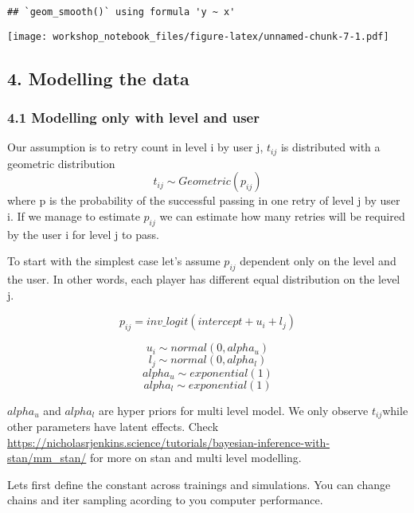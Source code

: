 \documentclass[
]{article}
\newenvironment{Shaded}{\begin{snugshade}}{\end{snugshade}}
\newcommand{\DecValTok}[1]{\textcolor[rgb]{0.00,0.00,0.81}{#1}}
\newcommand{\FunctionTok}[1]{\textcolor[rgb]{0.00,0.00,0.00}{#1}}
\newcommand{\NormalTok}[1]{#1}
\newcommand{\OtherTok}[1]{\textcolor[rgb]{0.56,0.35,0.01}{#1}}
\newcommand{\SpecialCharTok}[1]{\textcolor[rgb]{0.00,0.00,0.00}{#1}}
\begin{document}
\begin{verbatim}
## `geom_smooth()` using formula 'y ~ x'
\end{verbatim}

\texttt{[image: workshop\_notebook\_files/figure-latex/unnamed-chunk-7-1.pdf]}

\hypertarget{modelling-the-data}{%
\subsection{4. Modelling the data}\label{modelling-the-data}}

\hypertarget{modelling-only-with-level-and-user}{%
\subsubsection{4.1 Modelling only with level and
user}\label{modelling-only-with-level-and-user}}

Our assumption is to retry count in level i by user j, \(t_{ij}\) is
distributed with a geometric distribution
\[  t_{ij} \sim Geometric (p_{ij}) \] where p is the probability of the
successful passing in one retry of level j by user i. If we manage to
estimate \(p_{ij}\) we can estimate how many retries will be required by
the user i for level j to pass.

To start with the simplest case let's assume \(p_{ij}\) dependent only
on the level and the user. In other words, each player has different
equal distribution on the level j.

\[  p_{ij} = inv\_logit(intercept + u_i + l_j) \]

\[  u_i \sim normal (0, alpha_u) \] \[  l_j \sim normal (0, alpha_l) \]
\[  alpha_u \sim exponential (1) \] \[  alpha_l \sim exponential (1) \]

\(alpha_u\) and \(alpha_l\) are hyper priors for multi level model. We
only observe \(t_{ij}\)while other parameters have latent effects. Check
\url{https://nicholasrjenkins.science/tutorials/bayesian-inference-with-stan/mm_stan/}
for more on stan and multi level modelling.

Lets first define the constant across trainings and simulations. You can
change chains and iter sampling acording to you computer performance.

\begin{Shaded}
\end{Shaded}
\end{document}

